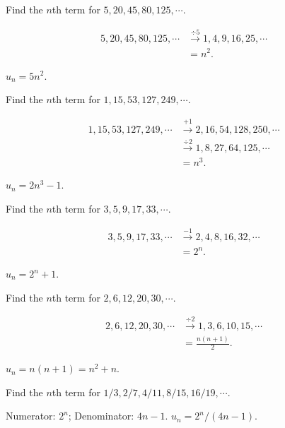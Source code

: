 \documentclass[8pt]{article}
\begin{document}
			\prob Find the \(n\)th term for \(5, 20, 45, 80, 125, \cdots\).
			
			\solution
			
			\begin{align*}
				5, 20, 45, 80, 125, \cdots &\xrightarrow{\div 5} 1, 4, 9, 16, 25, \cdots\\
				&= n^2.
			\end{align*}
			
			\(u_n = 5 n^2\).\newline

			\prob Find the \(n\)th term for \(1, 15, 53, 127, 249, \cdots\).
			
			\solution
			
			\begin{align*}
				1, 15, 53, 127, 249, \cdots &\xrightarrow{+1} 2, 16, 54, 128, 250, \cdots\\
				&\xrightarrow{\div 2} 1, 8, 27, 64, 125, \cdots\\
				&= n^3.
			\end{align*}
			
			\(u_n = 2n^3 - 1\).\newline

			\prob Find the \(n\)th term for \(3, 5, 9, 17, 33, \cdots\).
			
			\solution
			
			\begin{align*}
				3, 5, 9, 17, 33, \cdots &\xrightarrow{-1} 2, 4, 8, 16, 32, \cdots\\
				&= 2^n. 
			\end{align*}
			
			\(u_n = 2^{n} + 1\).\newline

			\prob Find the \(n\)th term for \(2, 6, 12, 20, 30, \cdots\).
			
			\solution

			\begin{align*}
				2, 6, 12, 20, 30, \cdots &\xrightarrow{\div 2} 1, 3, 6, 10, 15, \cdots\\
				&= \frac{n(n+1)}{2}.
			\end{align*}
			
			\(u_n = n(n+1) = n^2 + n\).\newline

			\prob Find the \(n\)th term for \(1/3, 2/7, 4/11, 8/15, 16/19, \cdots\).
			
			\solution Numerator: \(2^n\); Denominator: \(4n-1\). \(u_n = 2^n / (4n-1)\).\newline
\end{document}
